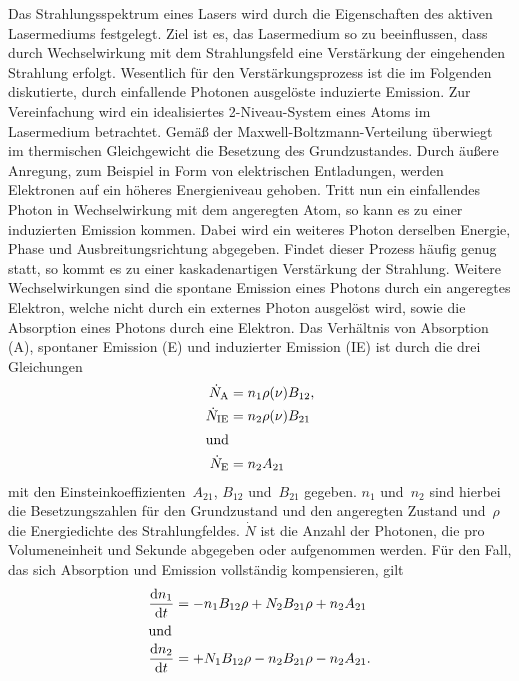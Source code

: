 Das Strahlungsspektrum eines Lasers wird durch die Eigenschaften des aktiven
Lasermediums festgelegt. Ziel ist es, das Lasermedium so zu beeinflussen, dass
durch Wechselwirkung mit dem Strahlungsfeld eine Verstärkung der eingehenden
Strahlung erfolgt. Wesentlich für den Verstärkungsprozess ist die im Folgenden
diskutierte, durch einfallende Photonen ausgelöste induzierte Emission. Zur
Vereinfachung wird ein idealisiertes 2-Niveau-System eines Atoms im Lasermedium
betrachtet. Gemäß der Maxwell-Boltzmann-Verteilung überwiegt im thermischen
Gleichgewicht die Besetzung des Grundzustandes. Durch äußere Anregung, zum
Beispiel in Form von elektrischen Entladungen, werden Elektronen auf ein höheres
Energieniveau gehoben. Tritt nun ein einfallendes Photon in Wechselwirkung mit
dem angeregten Atom, so kann es zu einer induzierten Emission kommen. Dabei wird
ein weiteres Photon derselben Energie, Phase und Ausbreitungsrichtung abgegeben.
Findet dieser Prozess häufig genug statt, so kommt es zu einer kaskadenartigen
Verstärkung der Strahlung. Weitere Wechselwirkungen sind die spontane Emission
eines Photons durch ein angeregtes Elektron, welche nicht durch ein externes
Photon ausgelöst wird, sowie die Absorption eines Photons durch eine Elektron.
Das Verhältnis von Absorption (A), spontaner Emission (E) und induzierter
Emission (IE) ist durch die drei Gleichungen
%
\begin{align}
  \dot{N}_{\mathrm{A}}&=n_1\rho(\nu)B_{12}, \\
  \dot{N}_{\mathrm{IE}}&=n_2\rho(\nu)B_{21} \\
  \shortintertext{und}
  \dot{N}_{\mathrm{E}}&=n_2A_{21}
\end{align}
%
mit den Einsteinkoeffizienten~$A_{21}$, $B_{12}$ und~$B_{21}$ gegeben. $n_1$
und~$n_2$ sind hierbei die Besetzungszahlen für den Grundzustand und den
angeregten Zustand und~$\rho$ die Energiedichte des Strahlungfeldes. $\dot{N}$
ist die Anzahl der Photonen, die pro Volumeneinheit und Sekunde abgegeben oder
aufgenommen werden. Für den Fall, das sich Absorption und Emission vollständig
kompensieren, gilt
%
\begin{align}
  \frac{\mathrm{d}n_1}{\mathrm{d}t}&=-n_1B_{12}\rho+N_2B_{21}\rho+n_2A_{21} \\
  \shortintertext{und}
  \frac{\mathrm{d}n_2}{\mathrm{d}t}&=+N_1B_{12}\rho-n_2B_{21}\rho-n_2A_{21}.
\end{align}

